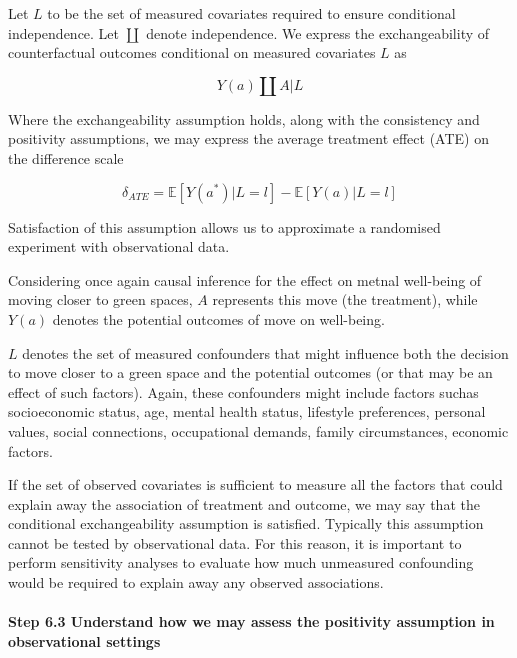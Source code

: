 \documentclass[
  singlecolumn]{article}
\let\oldparagraph\paragraph
\renewcommand{\paragraph}[1]{\oldparagraph{#1}\mbox{}}
\begin{document}
Let \(L\) to be the set of measured covariates required to ensure
conditional independence. Let \(\coprod\) denote independence. We
express the exchangeability of counterfactual outcomes conditional on
measured covariates \(L\) as

\[
Y(a) \coprod  A|L
\]

Where the exchangeability assumption holds, along with the consistency
and positivity assumptions, we may express the average treatment effect
(ATE) on the difference scale

\[
\delta_{ATE}  = \mathbb{E}[Y(a^*)|L = l] - \mathbb{E}[Y(a)|L = l]
\]

Satisfaction of this assumption allows us to approximate a randomised
experiment with observational data.

Considering once again causal inference for the effect on metnal
well-being of moving closer to green spaces, \(A\) represents this move
(the treatment), while \(Y(a)\) denotes the potential outcomes of move
on well-being.

\(L\) denotes the set of measured confounders that might influence both
the decision to move closer to a green space and the potential outcomes
(or that may be an effect of such factors). Again, these confounders
might include factors suchas socioeconomic status, age, mental health
status, lifestyle preferences, personal values, social connections,
occupational demands, family circumstances, economic factors.

If the set of observed covariates is sufficient to measure all the
factors that could explain away the association of treatment and
outcome, we may say that the conditional exchangeability assumption is
satisfied. Typically this assumption cannot be tested by observational
data. For this reason, it is important to perform sensitivity analyses
to evaluate how much unmeasured confounding would be required to explain
away any observed associations.

\hypertarget{step-6.3-understand-how-we-may-assess-the-positivity-assumption-in-observational-settings}{%
\paragraph{\texorpdfstring{\textbf{Step 6.3 Understand how we may assess
the positivity assumption in observational
settings}}{Step 6.3 Understand how we may assess the positivity assumption in observational settings}}\label{step-6.3-understand-how-we-may-assess-the-positivity-assumption-in-observational-settings}}
\end{document}
